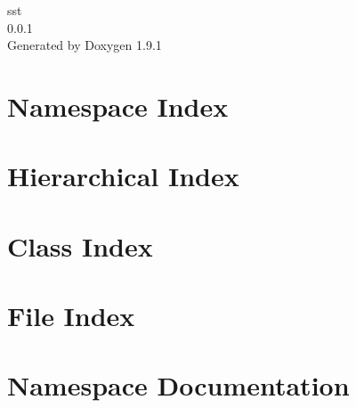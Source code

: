 \let\mypdfximage\pdfximage\def\pdfximage{\immediate\mypdfximage}\documentclass[twoside]{book}
\newcommand{\+}{\discretionary{\mbox{\scriptsize$\hookleftarrow$}}{}{}}
\newcommand{\clearemptydoublepage}{%
  \newpage{\pagestyle{empty}\cleardoublepage}%
}
\begin{document}
\raggedbottom

\hypersetup{pageanchor=false,
             bookmarksnumbered=true,
             pdfencoding=unicode
            }
\begin{titlepage}
\vspace*{7cm}
\begin{center}%
{\Large sst \\[1ex]\large 0.\+0.\+1 }\\
\vspace*{1cm}
{\large Generated by Doxygen 1.9.1}\\
\end{center}
\end{titlepage}
\clearemptydoublepage
{}
\tableofcontents
\clearemptydoublepage
{}
\hypersetup{pageanchor=true}

\chapter{Namespace Index}

\chapter{Hierarchical Index}

\chapter{Class Index}

\chapter{File Index}

\chapter{Namespace Documentation}

















\end{document}

